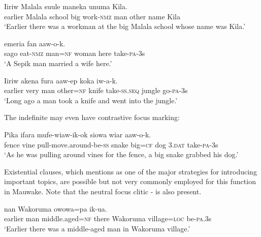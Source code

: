 \ea%
\label{ex:x1669}
\gll Iiriw  Malala  suule  maneka       unuma  Kila. \\
earlier  Malala  school  big  work-\textsc{nmz}  man  other  name  Kila \\
\glt`Earlier there was a workman at the big Malala school whose name was Kila.'
\z


\ea%
\label{ex:x1670}
\gll {}      emeria  fan  aaw-o-k.\\
sago  eat-\textsc{nmz}  man=\textsc{nf}  woman  here  take-\textsc{pa}-3s\\
\glt`A Sepik man married a wife here.'
\z


\ea%
\label{ex:x1671}
\gll Iiriw  akena     fura  aaw-ep  koka  iw-a-k.\\
earlier  very  man  other=\textsc{nf}  knife  take-\textsc{ss}.\textsc{seq}  jungle  go-\textsc{pa}-3s      \\
\glt`Long ago a man took a knife and went into the jungle.'
\z


The indefinite  may even have contrastive focus marking:

\ea%
\label{ex:x1666}
\gll Pika  ifara  mufe-wiaw-ik-ok     siowa wiar  aaw-o-k. \\
fence  vine  pull-move.around-be-\textsc{ss}  snake  big=\textsc{cf}  dog 3.\textsc{dat}  take-\textsc{pa}-3s\\
\glt`As he was pulling around vines for the fence, a big snake grabbed his dog.'
\z


Existential clauses, which \citet[741]{Givon1990} mentions as one of the major strategies for introducing important topics, are possible but not very commonly employed for this function in Mauwake. Note that the neutral focus clitic - is also present.

\ea%
\label{ex:x1672}
\gll {}     nan  Wakoruma  owowa=pa  ik-ua.\\
earlier  man  middle.aged=\textsc{nf}  there  Wakoruma  village=\textsc{loc}  be-\textsc{pa}.3s      \\
\glt`Earlier there was a middle-aged man in Wakoruma village.'
\z


